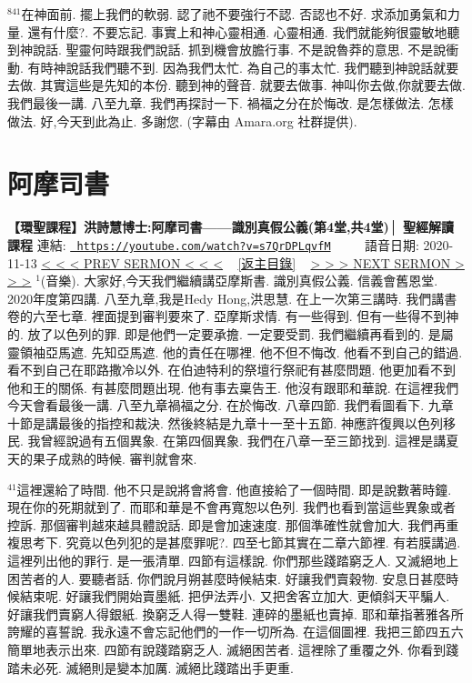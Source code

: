 \documentclass{book}
\begin{document}
$^{841}$在神面前.
擺上我們的軟弱.
認了祂不要強行不認.
否認也不好.
求添加勇氣和力量.
還有什麼?.
不要忘記.
事實上和神心靈相通.
心靈相通.
我們就能夠很靈敏地聽到神說話.
聖靈何時跟我們說話.
抓到機會放膽行事.
不是說魯莽的意思.
不是說衝動.
有時神說話我們聽不到.
因為我們太忙.
為自己的事太忙.
我們聽到神說話就要去做.
其實這些是先知的本份.
聽到神的聲音.
就要去做事.
神叫你去做,你就要去做.
我們最後一講.
八至九章.
我們再探討一下.
禍福之分在於悔改.
是怎樣做法.
怎樣做法.
好,今天到此為止.
多謝您.
(字幕由 Amara.org 社群提供).
\newpage



\section{阿摩司書}
\label{sec:s7QrDPLqvfM}
\textbf{【環聖課程】洪詩慧博士:阿摩司書——識別真假公義(第4堂,共4堂)│ 聖經解讀課程}
\newline
\newline
連結: \href{https://youtube.com/watch?v=s7QrDPLqvfM}{\texttt{ https://youtube.com/watch?v=s7QrDPLqvfM}} ~~~~ 語音日期: 2020-11-13 
\newline
\newline
\hyperref[sec:3OmAEo3dSsg]{\small{< < < PREV SERMON < < <}}
~
\hyperref[sec:index]{\small{[返主目錄]}}
~
\hyperref[sec:ovzkHTnXBCk]{\small{> > > NEXT SERMON > > >}}
\newline
\newline
$^{1}$(音樂).
大家好,今天我們繼續講亞摩斯書.
識別真假公義.
信義會舊恩堂.
2020年度第四講.
八至九章,我是Hedy Hong,洪思慧.
在上一次第三講時.
我們講書卷的六至七章.
裡面提到審判要來了.
亞摩斯求情.
有一些得到.
但有一些得不到神的.
放了以色列的罪.
即是他們一定要承擔.
一定要受罰.
我們繼續再看到的.
是屬靈領袖亞馬遮.
先知亞馬遮.
他的責任在哪裡.
他不但不悔改.
他看不到自己的錯過.
看不到自己在耶路撒冷以外.
在伯迪特利的祭壇行祭祀有甚麼問題.
他更加看不到他和王的關係.
有甚麼問題出現.
他有事去稟告王.
他沒有跟耶和華說.
在這裡我們今天會看最後一講.
八至九章禍福之分.
在於悔改.
八章四節.
我們看圖看下.
九章十節是講最後的指控和裁決.
然後終結是九章十一至十五節.
神應許復興以色列移民.
我曾經說過有五個異象.
在第四個異象.
我們在八章一至三節找到.
這裡是講夏天的果子成熟的時候.
審判就會來.

$^{41}$這裡還給了時間.
他不只是說將會將會.
他直接給了一個時間.
即是說數著時鐘.
現在你的死期就到了.
而耶和華是不會再寬恕以色列.
我們也看到當這些異象或者控訴.
那個審判越來越具體說話.
即是會加速速度.
那個準確性就會加大.
我們再重複思考下.
究竟以色列犯的是甚麼罪呢?.
四至七節其實在二章六節裡.
有若膜講過.
這裡列出他的罪行.
是一張清單.
四節有這樣說.
你們那些踐踏窮乏人.
又滅絕地上困苦者的人.
要聽者話.
你們說月朔甚麼時候結束.
好讓我們賣穀物.
安息日甚麼時候結束呢.
好讓我們開始賣墨紙.
把伊法弄小.
又把舍客立加大.
更傾斜天平騙人.
好讓我們賣窮人得銀紙.
換窮乏人得一雙鞋.
連碎的墨紙也賣掉.
耶和華指著雅各所誇耀的喜誓說.
我永遠不會忘記他們的一作一切所為.
在這個圖裡.
我把三節四五六簡單地表示出來.
四節有說踐踏窮乏人.
滅絕困苦者.
這裡除了重覆之外.
你看到踐踏未必死.
滅絕則是變本加厲.
滅絕比踐踏出手更重.
\end{document}
